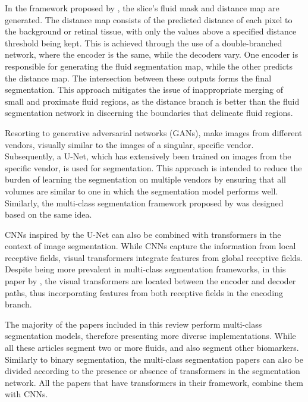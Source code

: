 \par
In the framework proposed by \textcite{Liu2021}, the  slice's fluid mask and distance map are generated. The distance map consists of the predicted distance of each pixel to the background or retinal tissue, with only the values above a specified distance threshold being kept. This is achieved through the use of a double-branched network, where the encoder is the same, while the decoders vary. One encoder is responsible for generating the fluid segmentation map, while the other predicts the distance map. The intersection between these outputs forms the final segmentation. This approach mitigates the issue of inappropriate merging of small and proximate fluid regions, as the distance branch is better than the fluid segmentation network in discerning the boundaries that delineate fluid regions.
\par
Resorting to generative adversarial networks (GANs), \textcite{Wu2023} make images from different vendors, visually similar to the images of a singular, specific vendor. Subsequently, a U-Net, which has extensively been trained on images from the specific vendor, is used for segmentation. This approach is intended to reduce the burden of learning the segmentation on multiple vendors by ensuring that all volumes are similar to one in which the segmentation model performs well. Similarly, the multi-class segmentation framework proposed by \textcite{Li2023} was designed based on the same idea. 
\par
CNNs inspired by the U-Net can also be combined with transformers in the context of image segmentation. While CNNs capture the information from local receptive fields, visual transformers integrate features from global receptive fields. Despite being more prevalent in multi-class segmentation frameworks, in this paper by \textcite{Quek2022}, the visual transformers are located between the encoder and decoder paths, thus incorporating features from both receptive fields in the encoding branch.
\par
The majority of the papers included in this review perform multi-class segmentation models, therefore presenting more diverse implementations. While all these articles segment two or more fluids, \textcite{Hassan2021a} and \textcite{Padilla2022} also segment other biomarkers. Similarly to binary segmentation, the multi-class segmentation papers can also be divided according to the presence \parencite{Zhang2023, Liu2024} or absence \parencite{Rahil2023, Hassan2021a, Sappa2021, Xing2022, Tang2022, Padilla2022, Hu2019, Mantel2021, Li2023, Gao2019, Hassan2021b, Lu2019} of transformers in the segmentation network. All the papers that have transformers in their framework, combine them with CNNs. 
